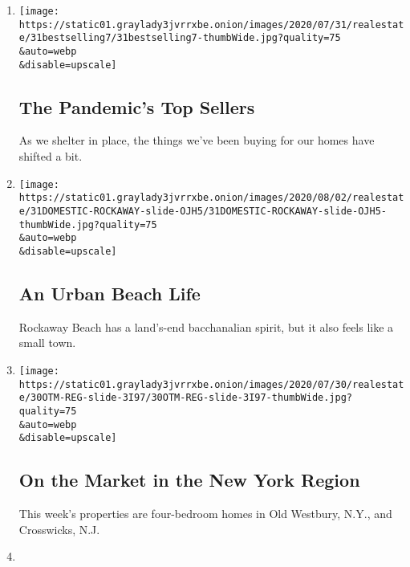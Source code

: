 \begin{enumerate}
\def\labelenumi{\arabic{enumi}.}
\item
  \href{/slideshow/2020/07/31/realestate/the-pandemics-top-sellers.html}{}

  \texttt{[image: https://static01.graylady3jvrrxbe.onion/images/2020/07/31/realestate/31bestselling7/31bestselling7-thumbWide.jpg?quality=75\\\&auto=webp\\\&disable=upscale]}

  \hypertarget{the-pandemics-top-sellers}{%
  \subsection{The Pandemic's Top
  Sellers}\label{the-pandemics-top-sellers}}

  As we shelter in place, the things we've been buying for our homes
  have shifted a bit.
\item
  \href{/slideshow/2020/07/31/realestate/an-urban-beach-life.html}{}

  \texttt{[image: https://static01.graylady3jvrrxbe.onion/images/2020/08/02/realestate/31DOMESTIC-ROCKAWAY-slide-OJH5/31DOMESTIC-ROCKAWAY-slide-OJH5-thumbWide.jpg?quality=75\\\&auto=webp\\\&disable=upscale]}

  \hypertarget{an-urban-beach-life}{%
  \subsection{An Urban Beach Life}\label{an-urban-beach-life}}

  Rockaway Beach has a land's-end bacchanalian spirit, but it also feels
  like a small town.
\item
  \href{/slideshow/2020/07/30/realestate/on-the-market-in-the-new-york-region.html}{}

  \texttt{[image: https://static01.graylady3jvrrxbe.onion/images/2020/07/30/realestate/30OTM-REG-slide-3I97/30OTM-REG-slide-3I97-thumbWide.jpg?quality=75\\\&auto=webp\\\&disable=upscale]}

  \hypertarget{on-the-market-in-the-new-york-region}{%
  \subsection{On the Market in the New York
  Region}\label{on-the-market-in-the-new-york-region}}

  This week's properties are four-bedroom homes in Old Westbury, N.Y.,
  and Crosswicks, N.J.
\item
  \href{/slideshow/2020/07/30/realestate/on-the-market-in-new-york-city.html}{}


\end{enumerate}
